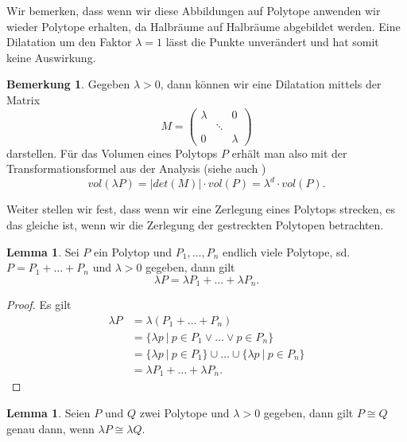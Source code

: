 \documentclass[11pt,titlepage]{article}
\newcommand{\abs}[1]{{\left| #1 \right|}}
\theoremstyle{definition}
\newtheorem{lemma}[theorem]{Lemma}
\newtheorem{remark}[theorem]{Bemerkung}
\theoremstyle{remark}
\begin{document}
	Wir bemerken, dass wenn wir diese Abbildungen auf Polytope anwenden wir wieder Polytope erhalten, da Halbräume auf Halbräume abgebildet werden. 
	Eine Dilatation um den Faktor $\lambda=1$ lässt die Punkte unverändert und 
	hat somit keine Auswirkung. 
	
	\begin{remark}\label{bem:dilvol}
		Gegeben $\lambda >0$, dann können wir eine Dilatation mittels der Matrix
		\[M=\begin{pmatrix}
		\lambda &\ & 0\\
		\ &\ddots &\ \\
		0 &\ &\lambda
		\end{pmatrix}\] 
		darstellen. Für das Volumen eines Polytops $P$ erhält man also mit 
		der Transformationsformel aus der Analysis (siehe auch \cite[Satz 4.7]{SkriptAna3})
		\[vol(\lambda P)=\abs{det(M)}\cdot vol(P)=\lambda^d\cdot vol(P).\]
	\end{remark}
	
	Weiter stellen wir fest, dass wenn wir eine Zerlegung eines Polytops strecken, 
	es das gleiche ist, wenn wir die Zerlegung der gestreckten Polytopen 
	betrachten.
	
	\begin{lemma} \label{lemma:dilzerl}
		Sei $P$ ein Polytop und $P_1,\ldots,P_n$ endlich viele Polytope, sd. 
		$P=P_1+\ldots+P_n$ und $\lambda>0$ gegeben, dann gilt 
		\[\lambda P=\lambda P_1+\ldots+\lambda P_n.\]
	\end{lemma}
	
	\begin{proof}
		Es gilt
		\begin{align*}
			\lambda P&=\lambda(P_1+\ldots+P_n)\\
			&=\{\lambda p\ \vert\ p\in P_1 	\lor\ldots\lor p\in P_n\}\\
			&=\{\lambda p\ \vert\ p\in P_1\}\cup\ldots\cup
			\{\lambda p\ \vert\ p\in P_n\}\\
			&=\lambda P_1 +\ldots+\lambda P_n.
		\end{align*}
	\end{proof}
	
	\begin{lemma} \label{lemma:dilkong}
		Seien $P$ und $Q$ zwei Polytope und $\lambda>0$ gegeben, dann gilt 
		$P\cong Q$ genau dann, wenn $\lambda P\cong \lambda Q$.
	\end{lemma}
	
\end{document}
